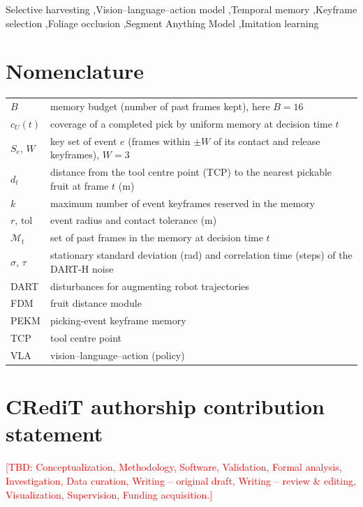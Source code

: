 \documentclass[preprint,review,12pt,authoryear]{elsarticle}
\newcommand{\tbd}[1]{\textcolor{red}{[TBD: #1]}}
\begin{document}
\begin{frontmatter}
\begin{keyword}
Selective harvesting \sep Vision--language--action model \sep Temporal memory \sep Keyframe selection \sep Foliage occlusion \sep Segment Anything Model \sep Imitation learning
\end{keyword}

\end{frontmatter}

\section*{Nomenclature}
\begin{tabular}{lp{11.2cm}}
$B$ & memory budget (number of past frames kept), here $B=16$\\
$c_U(t)$ & coverage of a completed pick by uniform memory at decision time $t$\\
$S_e$, $W$ & key set of event $e$ (frames within $\pm W$ of its contact and release keyframes), $W=3$\\
$d_t$ & distance from the tool centre point (TCP) to the nearest pickable fruit at frame $t$ (m)\\
$k$ & maximum number of event keyframes reserved in the memory\\
$r$, $\mathrm{tol}$ & event radius and contact tolerance (m)\\
$\mathcal{M}_t$ & set of past frames in the memory at decision time $t$\\
$\sigma$, $\tau$ & stationary standard deviation (rad) and correlation time (steps) of the DART-H noise\\
DART & disturbances for augmenting robot trajectories \citep{laskey2017dart}\\
FDM & fruit distance module\\
PEKM & picking-event keyframe memory\\
TCP & tool centre point\\
VLA & vision--language--action (policy)\\
\end{tabular}










\section*{CRediT authorship contribution statement}
\tbd{Conceptualization, Methodology, Software, Validation, Formal analysis, Investigation, Data curation, Writing -- original draft, Writing -- review \& editing, Visualization, Supervision, Funding acquisition.}
\end{document}
